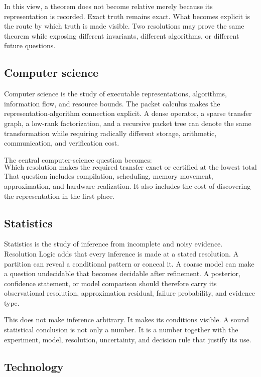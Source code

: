 \documentclass[11pt]{article}
\theoremstyle{definition}
\theoremstyle{remark}
\begin{document}
In this view, a theorem does not become relative merely because its representation is recorded.  Exact truth remains exact.  What becomes explicit is the route by which truth is made visible.  Two resolutions may prove the same theorem while exposing different invariants, different algorithms, or different future questions.

\subsection{Computer science}

Computer science is the study of executable representations, algorithms, information flow, and resource bounds.  The packet calculus makes the representation-algorithm connection explicit.  A dense operator, a sparse transfer graph, a low-rank factorization, and a recursive packet tree can denote the same transformation while requiring radically different storage, arithmetic, communication, and verification cost.

The central computer-science question becomes:
\[
\text{Which resolution makes the required transfer exact or certified at the lowest total cost?}
\]
That question includes compilation, scheduling, memory movement, approximation, and hardware realization.  It also includes the cost of discovering the representation in the first place.

\subsection{Statistics}

Statistics is the study of inference from incomplete and noisy evidence.  Resolution Logic adds that every inference is made at a stated resolution.  A partition can reveal a conditional pattern or conceal it.  A coarse model can make a question undecidable that becomes decidable after refinement.  A posterior, confidence statement, or model comparison should therefore carry its observational resolution, approximation residual, failure probability, and evidence type.

This does not make inference arbitrary.  It makes its conditions visible.  A sound statistical conclusion is not only a number.  It is a number together with the experiment, model, resolution, uncertainty, and decision rule that justify its use.

\subsection{Technology}
\end{document}
